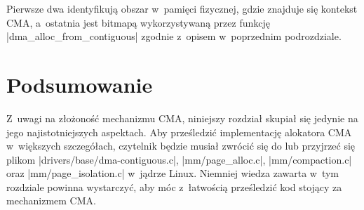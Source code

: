 Pierwsze dwa identyfikują obszar w~pamięci fizycznej, gdzie znajduje
się kontekst CMA, a~ostatnia jest bitmapą wykorzystywaną przez funkcję
\code|dma_alloc_from_contiguous| zgodnie z~opisem w~poprzednim
podrozdziale.


\section{Podsumowanie}

Z~uwagi na złożoność mechanizmu CMA, niniejszy rozdział skupiał się
jedynie na jego najistotniejszych aspektach.  Aby prześledzić
implementację alokatora CMA w~większych szczegółach, czytelnik będzie
musiał zwrócić się do \autocite{patch:cma-24} lub przyjrzeć się plikom
\code|drivers/base/dma-contiguous.c|, \code|mm/page_alloc.c|,
\code|mm/compaction.c| oraz \code|mm/page_isolation.c| w~jądrze Linux.
Niemniej wiedza zawarta w~tym rozdziale powinna wystarczyć, aby móc
z~łatwością prześledzić kod stojący za mechanizmem CMA.
